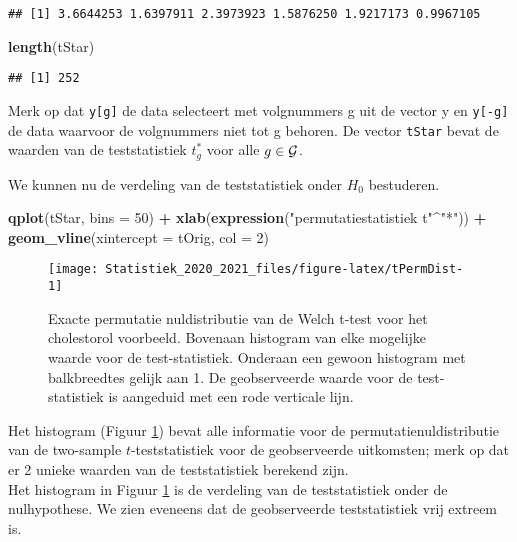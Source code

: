 \documentclass[
  12pt,dutch,coursenotes]{book}
\newenvironment{Shaded}{\begin{snugshade}}{\end{snugshade}}
\newcommand{\DataTypeTok}[1]{\textcolor[rgb]{0.13,0.29,0.53}{#1}}
\newcommand{\DecValTok}[1]{\textcolor[rgb]{0.00,0.00,0.81}{#1}}
\newcommand{\KeywordTok}[1]{\textcolor[rgb]{0.13,0.29,0.53}{\textbf{#1}}}
\newcommand{\NormalTok}[1]{#1}
\newcommand{\OperatorTok}[1]{\textcolor[rgb]{0.81,0.36,0.00}{\textbf{#1}}}
\newcommand{\StringTok}[1]{\textcolor[rgb]{0.31,0.60,0.02}{#1}}
\theoremstyle{definition}
\theoremstyle{definition}
\theoremstyle{definition}
\theoremstyle{remark}
\begin{document}
\begin{verbatim}
## [1] 3.6644253 1.6397911 2.3973923 1.5876250 1.9217173 0.9967105
\end{verbatim}

\begin{Shaded}
\begin{Highlighting}[]
\KeywordTok{length}\NormalTok{(tStar)}
\end{Highlighting}
\end{Shaded}

\begin{verbatim}
## [1] 252
\end{verbatim}

Merk op dat \texttt{y{[}g{]}} de data selecteert met volgnummers g uit de vector y en \texttt{y{[}-g{]}} de data waarvoor de volgnummers niet tot g behoren.
De vector \texttt{tStar} bevat de waarden van de teststatistiek \(t^*_g\) voor alle \(g \in {\cal{G}}\).

We kunnen nu de verdeling van de teststatistiek onder \(H_0\) bestuderen.

\begin{Shaded}
\begin{Highlighting}[]
\KeywordTok{qplot}\NormalTok{(tStar, }\DataTypeTok{bins =} \DecValTok{50}\NormalTok{) }\OperatorTok{+}\StringTok{ }\KeywordTok{xlab}\NormalTok{(}\KeywordTok{expression}\NormalTok{(}\StringTok{"permutatiestatistiek t"}\OperatorTok{\^{}}\StringTok{"*"}\NormalTok{)) }\OperatorTok{+}\StringTok{ }
\StringTok{    }\KeywordTok{geom\_vline}\NormalTok{(}\DataTypeTok{xintercept =}\NormalTok{ tOrig, }\DataTypeTok{col =} \DecValTok{2}\NormalTok{)}
\end{Highlighting}
\end{Shaded}

\begin{figure}

{\centering \texttt{[image: Statistiek\_2020\_2021\_files/figure-latex/tPermDist-1]} 

}

\caption{Exacte permutatie nuldistributie van de Welch t-test voor het cholestorol voorbeeld. Bovenaan histogram van elke mogelijke waarde voor de test-statistiek. Onderaan een gewoon histogram met balkbreedtes gelijk aan 1. De geobserveerde waarde voor de test-statistiek is aangeduid met een rode verticale lijn.}\label{fig:tPermDist}
\end{figure}

Het histogram (Figuur \ref{fig:tPermDist}) bevat alle informatie voor de permutatienuldistributie van de two-sample \(t\)-teststatistiek voor de geobserveerde uitkomsten; merk op dat er 2 unieke waarden van de teststatistiek berekend zijn.\\
Het histogram in Figuur \ref{fig:tPermDist} is de verdeling van de teststatistiek onder de nulhypothese.
We zien eveneens dat de geobserveerde teststatistiek vrij extreem is.
\end{document}
